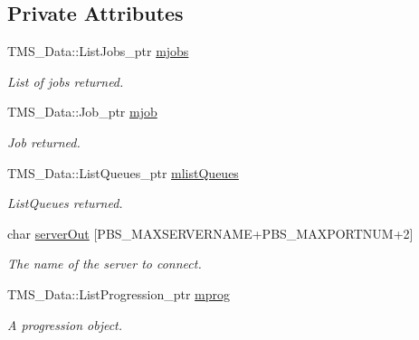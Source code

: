 \subsection*{Private Attributes}
\begin{DoxyCompactItemize}
\item 
\hypertarget{classTorqueServer_ad3fa1d5687b1c0776c3f6f59aea8bc04}{
TMS\_\-Data::ListJobs\_\-ptr \hyperlink{classTorqueServer_ad3fa1d5687b1c0776c3f6f59aea8bc04}{mjobs}}
\label{classTorqueServer_ad3fa1d5687b1c0776c3f6f59aea8bc04}

\begin{DoxyCompactList}\small\item\em List of jobs returned. \item\end{DoxyCompactList}\item 
\hypertarget{classTorqueServer_a4cd336ecc71dec247367e6b26a52efab}{
TMS\_\-Data::Job\_\-ptr \hyperlink{classTorqueServer_a4cd336ecc71dec247367e6b26a52efab}{mjob}}
\label{classTorqueServer_a4cd336ecc71dec247367e6b26a52efab}

\begin{DoxyCompactList}\small\item\em Job returned. \item\end{DoxyCompactList}\item 
\hypertarget{classTorqueServer_ada6a31f5672ecf7297dfac26ed62e19a}{
TMS\_\-Data::ListQueues\_\-ptr \hyperlink{classTorqueServer_ada6a31f5672ecf7297dfac26ed62e19a}{mlistQueues}}
\label{classTorqueServer_ada6a31f5672ecf7297dfac26ed62e19a}

\begin{DoxyCompactList}\small\item\em ListQueues returned. \item\end{DoxyCompactList}\item 
\hypertarget{classTorqueServer_ae798d6ea4f01fc4336756a0cba5a644c}{
char \hyperlink{classTorqueServer_ae798d6ea4f01fc4336756a0cba5a644c}{serverOut} \mbox{[}PBS\_\-MAXSERVERNAME+PBS\_\-MAXPORTNUM+2\mbox{]}}
\label{classTorqueServer_ae798d6ea4f01fc4336756a0cba5a644c}

\begin{DoxyCompactList}\small\item\em The name of the server to connect. \item\end{DoxyCompactList}\item 
\hypertarget{classTorqueServer_addd31a54497c49a5ef552e96a0682518}{
TMS\_\-Data::ListProgression\_\-ptr \hyperlink{classTorqueServer_addd31a54497c49a5ef552e96a0682518}{mprog}}
\label{classTorqueServer_addd31a54497c49a5ef552e96a0682518}

\begin{DoxyCompactList}\small\item\em A progression object. \item\end{DoxyCompactList}\end{DoxyCompactItemize}


